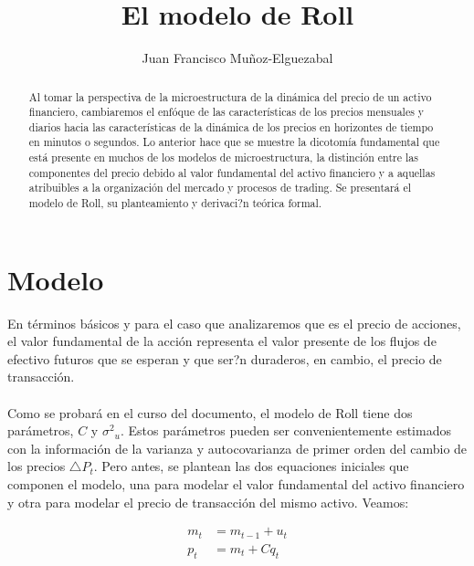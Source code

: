 \documentclass[a4paper]{article}
\title{El modelo de Roll}
\author{Juan Francisco Mu\~noz-Elguezabal}
\begin{document}

\maketitle

\begin{abstract}

Al tomar la perspectiva de la microestructura de la din\'amica del precio de un activo financiero, cambiaremos el enf\'oque de las caracter\'isticas de los precios mensuales y diarios hacia las caracter\'isticas de la din\'amica de los precios en horizontes de tiempo en minutos o segundos. Lo anterior hace que se muestre la dicotom\'ia fundamental que est\'a presente en muchos de los modelos de microestructura, la distinci\'on entre las componentes del precio debido al valor fundamental del activo financiero y a aquellas atribuibles a la organizaci\'on del mercado y procesos de trading. Se presentar\'a el modelo de Roll, su planteamiento y derivaci?n te\'orica formal. 
\end{abstract}

\newpage


\section{Modelo}

En t\'erminos b\'asicos y para el caso que analizaremos que es el precio de acciones, el valor fundamental de la acci\'on representa el valor presente de los flujos de efectivo futuros que se esperan y que ser?n duraderos, en cambio, el precio de transacci\'on. \\\\
Como se probar\'a en el curso del documento, el modelo de Roll tiene dos par\'ametros, $C$ y ${{\sigma}^{2}}_{u}$. Estos par\'ametros pueden ser convenientemente estimados con la informaci\'on de la varianza y autocovarianza de primer orden del cambio de los precios $\triangle{P}_{t}$. Pero antes, se plantean las dos equaciones iniciales que componen el modelo, una para modelar el valor fundamental del activo financiero y otra para modelar el precio de transacci\'on del mismo activo. Veamos:

\begin{equation}
\begin{aligned}
	{m}_{t} &= {m}_{t-1} + {u}_{t} \\
	{p}_{t} &= {m}_{t} + C{q}_{t} \\
\end{aligned}
\end{equation}
\end{document}
